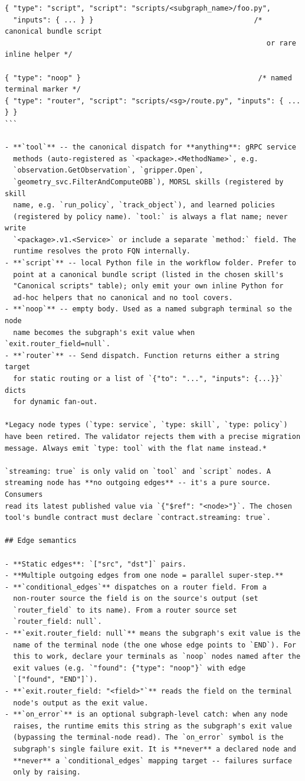 \begin{lstlisting}
{ "type": "script", "script": "scripts/<subgraph_name>/foo.py",
  "inputs": { ... } }                                      /* canonical bundle script
                                                              or rare inline helper */

{ "type": "noop" }                                          /* named terminal marker */
{ "type": "router", "script": "scripts/<sg>/route.py", "inputs": { ... } }
```

- **`tool`** -- the canonical dispatch for **anything**: gRPC service
  methods (auto-registered as `<package>.<MethodName>`, e.g.
  `observation.GetObservation`, `gripper.Open`,
  `geometry_svc.FilterAndComputeOBB`), MORSL skills (registered by skill
  name, e.g. `run_policy`, `track_object`), and learned policies
  (registered by policy name). `tool:` is always a flat name; never write
  `<package>.v1.<Service>` or include a separate `method:` field. The
  runtime resolves the proto FQN internally.
- **`script`** -- local Python file in the workflow folder. Prefer to
  point at a canonical bundle script (listed in the chosen skill's
  "Canonical scripts" table); only emit your own inline Python for
  ad-hoc helpers that no canonical and no tool covers.
- **`noop`** -- empty body. Used as a named subgraph terminal so the node
  name becomes the subgraph's exit value when `exit.router_field=null`.
- **`router`** -- Send dispatch. Function returns either a string target
  for static routing or a list of `{"to": "...", "inputs": {...}}` dicts
  for dynamic fan-out.

*Legacy node types (`type: service`, `type: skill`, `type: policy`)
have been retired. The validator rejects them with a precise migration
message. Always emit `type: tool` with the flat name instead.*

`streaming: true` is only valid on `tool` and `script` nodes. A
streaming node has **no outgoing edges** -- it's a pure source. Consumers
read its latest published value via `{"$ref": "<node>"}`. The chosen
tool's bundle contract must declare `contract.streaming: true`.

## Edge semantics

- **Static edges**: `["src", "dst"]` pairs.
- **Multiple outgoing edges from one node = parallel super-step.**
- **`conditional_edges`** dispatches on a router field. From a
  non-router source the field is on the source's output (set
  `router_field` to its name). From a router source set
  `router_field: null`.
- **`exit.router_field: null`** means the subgraph's exit value is the
  name of the terminal node (the one whose edge points to `END`). For
  this to work, declare your terminals as `noop` nodes named after the
  exit values (e.g. `"found": {"type": "noop"}` with edge
  `["found", "END"]`).
- **`exit.router_field: "<field>"`** reads the field on the terminal
  node's output as the exit value.
- **`on_error`** is an optional subgraph-level catch: when any node
  raises, the runtime emits this string as the subgraph's exit value
  (bypassing the terminal-node read). The `on_error` symbol is the
  subgraph's single failure exit. It is **never** a declared node and
  **never** a `conditional_edges` mapping target -- failures surface
  only by raising.


\end{lstlisting}
